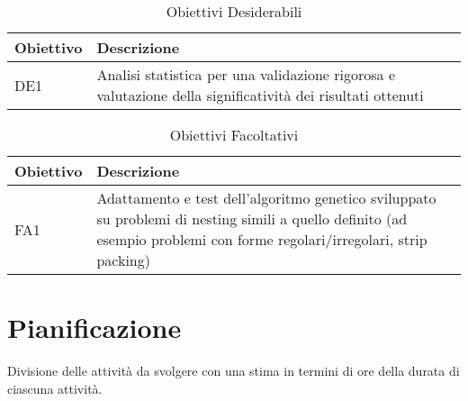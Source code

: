 \begin{table}[H]
\centering
\begin{tabular}{|l|p{10cm}|}
\hline
\textbf{Obiettivo} & \textbf{Descrizione} \\ \hline
DE1 & Analisi statistica per una validazione rigorosa e valutazione della significatività dei risultati ottenuti \\ \hline
\end{tabular}
\caption{Obiettivi Desiderabili}
\end{table}

\begin{table}[H]
\centering
\begin{tabular}{|l|p{10cm}|}
\hline
\textbf{Obiettivo} & \textbf{Descrizione} \\ \hline
FA1 & Adattamento e test dell'algoritmo genetico sviluppato su problemi di nesting simili a quello definito (ad esempio problemi con forme regolari/irregolari, strip packing) \\ \hline
\end{tabular}
\caption{Obiettivi Facoltativi}
\end{table}

\section{Pianificazione}

Divisione delle attività da svolgere con una stima in termini di ore della durata di ciascuna attività.\\

